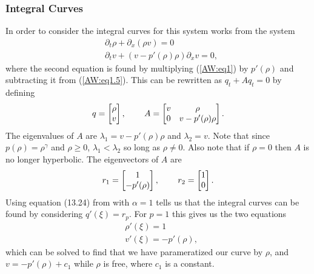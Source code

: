 \documentclass{article}
\begin{document}
\subsubsection{Integral Curves}
In order to consider the integral curves for this system \cite{AwRascle2000} 
works from the system
\begin{align*}
&\partial_t \rho + \partial_x (\rho v) = 0 \\ 
&\partial_t v + \left(v - p'(\rho)\rho\right)\partial_x v = 0,
\end{align*}
where the second equation is found by multiplying (\ref{AW:eq1}) 
by $p'(\rho)$ and subtracting it from (\ref{AW:eq1.5}). 
This can be rewritten as $q_t + Aq_t = 0$ by defining
\begin{align*}
q = \left[ \begin{matrix}
\rho \\ v
\end{matrix}\right] , \hspace{0.3in}
A = \left[ \begin{matrix}
v & \rho \\
0 & v - p'(\rho ) \rho
\end{matrix}\right].
\end{align*}
The eigenvalues of $A$ are $\lambda_1 = v - p'(\rho ) \rho$ and 
$\lambda_2 = v$. Note that since $p(\rho ) = \rho^{\gamma}$ 
and $\rho \geq 0$, $\lambda_1 < \lambda_2$ so long as $\rho \neq 0$. 
Also note that if $\rho = 0$ then $A$ is no longer 
hyperbolic. The eigenvectors of $A$ are
\begin{align*}
r_1 = \left[ \begin{matrix}
1 \\ - p'(\rho )
\end{matrix}\right], \hspace{0.3in}
r_2 = \left[ \begin{matrix}
1 \\ 0
\end{matrix}\right].
\end{align*}
Using equation (13.24) from \cite{LeVeque2002} with $\alpha = 1$ tells us 
that the integral curves can be found by considering $q'(\xi ) = r_p$. 
For $p = 1$ this gives us the two equations
\begin{align*}
&\rho'(\xi ) = 1 \\
&v'(\xi ) = - p'(\rho ),
\end{align*}
which can be solved to find that we have parameratized our curve by $\rho$, 
and $v = - p'(\rho ) + c_1$ while $\rho$ is free, where $c_1$ is a constant. 
\end{document}
